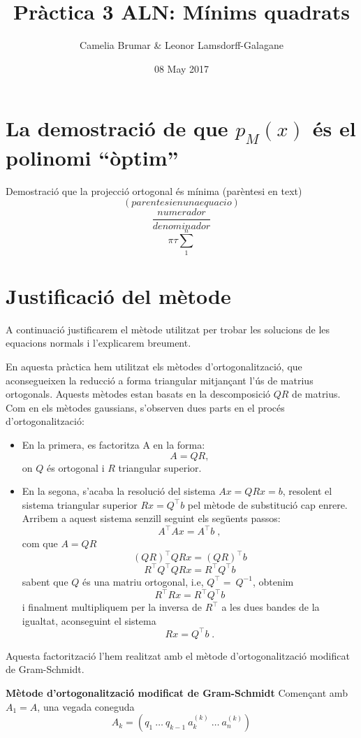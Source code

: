 \documentclass{article}
\title{Pràctica 3 ALN: Mínims quadrats}
\author{Camelia Brumar & Leonor Lamsdorff-Galagane}
\date{08 May 2017}
\begin{document}
\maketitle

\section{La demostració de que $p_{M}(x)$ és el polinomi “òptim”}
Demostració que la projecció ortogonal és mínima (parèntesi en text)
$$ \left(parentesi en una equacio \right) $$
$$ \frac{numerador}{denominador} $$
$$ \pi \tau \sum_1^n$$


\section{Justificació del mètode}
A continuació justificarem el mètode utilitzat per trobar les solucions de les equacions normals i l'explicarem breument.

En aquesta pràctica hem utilitzat els mètodes d'ortogonalització, que aconsegueixen la reducció a forma triangular mitjançant l'ús de matrius ortogonals. Aquests mètodes estan basats en la descomposició $QR$ de matrius. Com en els mètodes gaussians, s'observen dues parts en el procés d'ortogonalització:

\begin{itemize}
  \item En la primera, es factoritza A en la forma:
  $$ A =  QR, $$
  on $Q$ és ortogonal i $R$ triangular superior.
  \item En la segona, s'acaba la resolució del sistema $Ax = QRx = b$, resolent el sistema triangular superior $Rx = Q^\top b$ pel mètode de substitució cap enrere. Arribem a aquest sistema senzill seguint els següents passos: 
  $$A^\top Ax = A^\top b \;,$$
  com que $A = QR$
  $$\left(QR \right)^\top QRx = \left(QR \right)^\top b$$
  $$R^\top Q^\top  QRx = R^\top Q^\top  b$$
  sabent que $Q$ és una matriu ortogonal, i.e, $Q^\top =\ Q^{-1}$, obtenim
  $$R^\top Rx = R^\top Q^\top  b$$
  i finalment multipliquem per la inversa de $R^\top$ a les dues bandes de la igualtat, aconseguint el sistema
  $$Rx = Q^\top b \; .$$
\end{itemize}

Aquesta factorització l'hem realitzat amb el mètode d'ortogonalització mo\-di\-fi\-cat de Gram-Schmidt.\newline

\newline
\textbf{Mètode d'ortogonalització modificat de Gram-Schmidt} \newline
Començant amb $A_{1} = A$, una vegada coneguda
$$A_{k} = \left(q_{1}\: \ldots{}\: q_{k-1}\: a_{k}^{(k)}\: \ldots{} \:a_{n}^{(k)} \right)$$
\end{document}
